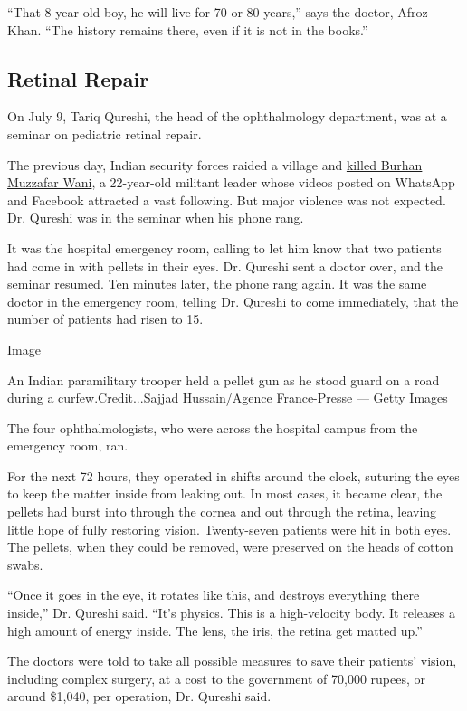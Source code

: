 ``That 8-year-old boy, he will live for 70 or 80 years,'' says the
doctor, Afroz Khan. ``The history remains there, even if it is not in
the books.''

\hypertarget{retinal-repair}{%
\subsection{Retinal Repair}\label{retinal-repair}}

On July 9, Tariq Qureshi, the head of the ophthalmology department, was
at a seminar on pediatric retinal repair.

The previous day, Indian security forces raided a village and
\href{http://www.bbc.com/news/world-asia-india-36762043}{killed Burhan
Muzzafar Wani}, a 22-year-old militant leader whose videos posted on
WhatsApp and Facebook attracted a vast following. But major violence was
not expected. Dr. Qureshi was in the seminar when his phone rang.

It was the hospital emergency room, calling to let him know that two
patients had come in with pellets in their eyes. Dr. Qureshi sent a
doctor over, and the seminar resumed. Ten minutes later, the phone rang
again. It was the same doctor in the emergency room, telling Dr. Qureshi
to come immediately, that the number of patients had risen to 15.

Image

An Indian paramilitary trooper held a pellet gun as he stood guard on a
road during a curfew.Credit...Sajjad Hussain/Agence France-Presse ---
Getty Images

The four ophthalmologists, who were across the hospital campus from the
emergency room, ran.

For the next 72 hours, they operated in shifts around the clock,
suturing the eyes to keep the matter inside from leaking out. In most
cases, it became clear, the pellets had burst into through the cornea
and out through the retina, leaving little hope of fully restoring
vision. Twenty-seven patients were hit in both eyes. The pellets, when
they could be removed, were preserved on the heads of cotton swabs.

``Once it goes in the eye, it rotates like this, and destroys everything
there inside,'' Dr. Qureshi said. ``It's physics. This is a
high-velocity body. It releases a high amount of energy inside. The
lens, the iris, the retina get matted up.''

The doctors were told to take all possible measures to save their
patients' vision, including complex surgery, at a cost to the government
of 70,000 rupees, or around \$1,040, per operation, Dr. Qureshi said.

